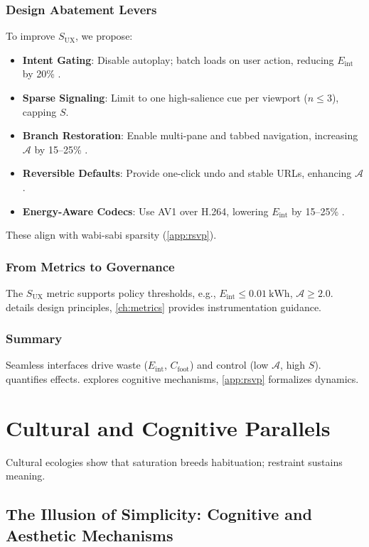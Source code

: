 \documentclass[openany]{book}
\newcommand{\Sent}{S} %
\newcommand{\Eint}{E_{\mathrm{int}}} %
\newcommand{\Cfoot}{C_{\mathrm{foot}}} %
\newcommand{\Auton}{\mathcal{A}} %
\newcommand{\SUX}{S_{\mathrm{UX}}} %
\newcommand{\kWh}{\mathrm{kWh}}
\begin{document}
\section{Design Abatement Levers}
\label{sec:abatement}
To improve \(\SUX\), we propose:
\begin{itemize}
  \item \textbf{Intent Gating}: Disable autoplay; batch loads on user action, reducing \(\Eint\) by 20\% \citep{extentia2024}.
  \item \textbf{Sparse Signaling}: Limit to one high-salience cue per viewport (\(n \leq 3\)), capping \(\Sent\).
  \item \textbf{Branch Restoration}: Enable multi-pane and tabbed navigation, increasing \(\Auton\) by 15--25\% \citep{doctorow2022}.
  \item \textbf{Reversible Defaults}: Provide one-click undo and stable URLs, enhancing \(\Auton\).
  \item \textbf{Energy-Aware Codecs}: Use AV1 over H.264, lowering \(\Eint\) by 15--25\% \citep{extentia2024}.
\end{itemize}
These align with wabi-sabi sparsity (\cref{app:rsvp}).

\section{From Metrics to Governance}
\label{sec:governance-preview}
The \(\SUX\) metric supports policy thresholds, e.g., \(\Eint \leq \SI{0.01}{\kWh}\), \(\Auton \geq 2.0\).  details design principles, \cref{ch:metrics} provides instrumentation guidance.

\section{Summary}
Seamless interfaces drive waste (\(\Eint\), \(\Cfoot\)) and control (low \(\Auton\), high \(\Sent\)).  quantifies effects.  explores cognitive mechanisms, \cref{app:rsvp} formalizes dynamics.

\part{Cultural and Cognitive Parallels}
Cultural ecologies show that saturation breeds habituation; restraint sustains meaning.

\chapter{The Illusion of Simplicity: Cognitive and Aesthetic Mechanisms}
\label{ch:illusion}
\end{document}
